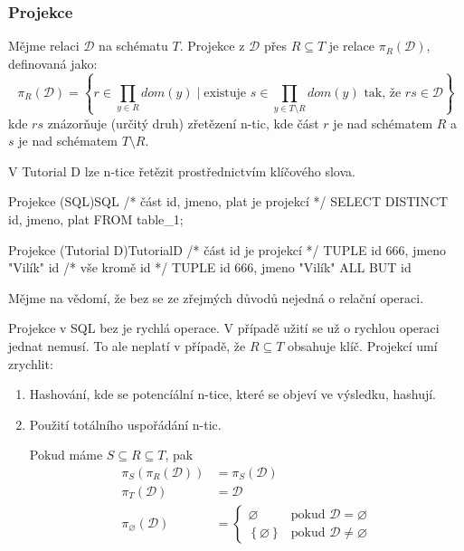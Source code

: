 \subsubsection{Projekce}
Mějme relaci $\mathcal{D}$ na schématu $T$. Projekce z $\mathcal{D}$ přes $R \subseteq T$ je relace $\pi_{R}(\mathcal{D})$, definovaná jako:
$$
\pi_{R}(\mathcal{D}) = \left\{ r \in \prod_{y \in R} dom(y) \; | \; \text{existuje } s \in \prod_{y \in T \setminus R} dom(y) \text{ tak, že } rs \in \mathcal{D} \right\}
$$
kde $rs$ znázorňuje (určitý druh) zřetězení n-tic, kde část $r$ je nad schématem $R$ a $s$ je nad schématem $ T \setminus R$.

V Tutorial D lze n-tice řetězit prostřednictvím klíčového slova.
\begin{upcode}{Projekce (SQL)}{}{SQL}
/* část id, jmeno, plat je projekcí */
SELECT DISTINCT id, jmeno, plat FROM table_1;
\end{upcode}
\begin{upcode}{Projekce (Tutorial D)}{}{TutorialD}
/* část {id} je projekcí */
TUPLE {id 666, jmeno "Vilík"} {id}
/* vše kromě id */
TUPLE {id 666, jmeno "Vilík"} {ALL BUT id}
\end{upcode}
Mějme na vědomí, že bez se ze zřejmých důvodů nejedná o relační operaci.

Projekce v SQL bez je rychlá operace. V případě užití se už o rychlou operaci jednat nemusí. To ale neplatí v případě, že $R \subseteq T$ obsahuje klíč. Projekcí umí zrychlit:
\begin{enumerate}
\item Hashování, kde se potencíální n-tice, které se objeví ve výsledku, hashují.
\item Použití totálního uspořádání n-tic.
\begin{upquote}
Pokud máme $S \subseteq R \subseteq T$, pak
\begin{align*}
\pi_{S} (\pi_{R}(\mathcal{D})) &= \pi_{S}(\mathcal{D}) \\
\pi_{T} (\mathcal{D}) &= \mathcal{D} \\
\pi_{\varnothing} (\mathcal{D}) &=\left\{\!\!\!
\begin{array}{ll}
\varnothing & \text{pokud } \mathcal{D} = \varnothing \\
\left\{ \varnothing \right\} & \text{pokud } \mathcal{D} \neq \varnothing
\end{array}\right.
\end{align*}
\end{upquote}
\end{enumerate}


